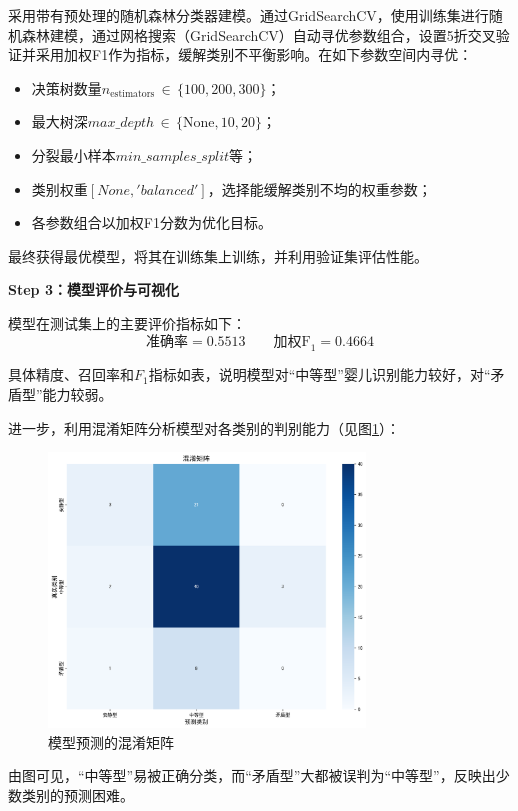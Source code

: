 \documentclass[withoutpreface,bwprint]{cumcmthesis}
\begin{document}
采用带有预处理的随机森林分类器建模。通过GridSearchCV，使用训练集进行随机森林建模，通过网格搜索（GridSearchCV）自动寻优参数组合，设置5折交叉验证并采用加权F1作为指标，缓解类别不平衡影响。在如下参数空间内寻优：

\begin{itemize}
    \item 决策树数量$n_\text{estimators}\,\in\,\{100, 200, 300\}$；
    \item 最大树深$max\_depth\,\in\,\{\text{None}, 10, 20\}$；
    \item 分裂最小样本$min\_samples\_split$等；
    \item 类别权重$[None, 'balanced']$，选择能缓解类别不均的权重参数；
    \item 各参数组合以加权F1分数为优化目标。
\end{itemize}

最终获得最优模型，将其在训练集上训练，并利用验证集评估性能。

\textbf{Step 3：模型评价与可视化}

模型在测试集上的主要评价指标如下：
\[
\text{准确率} = 0.5513\qquad
\text{加权F}_1 = 0.4664
\]

具体精度、召回率和$F_1$指标如表，说明模型对“中等型”婴儿识别能力较好，对“矛盾型”能力较弱。

进一步，利用混淆矩阵分析模型对各类别的判别能力（见图\ref{fig:conf-mat}）：
\begin{figure}[H]
    \centering
    \includegraphics[width=0.75\textwidth]{figures/confusion_matrix.png}
    \caption{模型预测的混淆矩阵}
    \label{fig:conf-mat}
\end{figure}
由图可见，“中等型”易被正确分类，而“矛盾型”大都被误判为“中等型”，反映出少数类别的预测困难。
\end{document}
